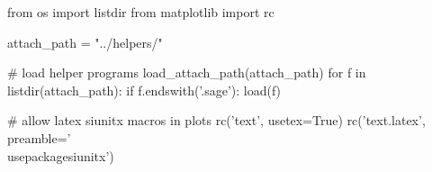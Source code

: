 \begin{sagesilent}
    from os import listdir
    from matplotlib import rc

    attach_path = "../helpers/"

    # load helper programs
    load_attach_path(attach_path)
    for f in listdir(attach_path):
        if f.endswith('.sage'): load(f)

    # allow latex siunitx macros in plots
    rc('text', usetex=True)
    rc('text.latex', preamble='\\usepackage{siunitx}')
\end{sagesilent}